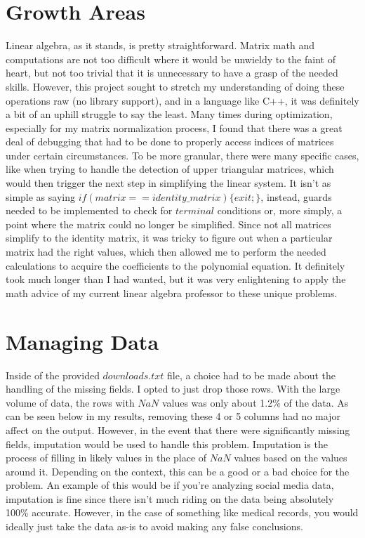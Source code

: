 \documentclass[11pt]{apa6}
\begin{document}
\section{Growth Areas}
Linear algebra, as it stands, is pretty straightforward. Matrix math and computations are not too difficult where it would be unwieldy to the faint of heart, but not too trivial that it is unnecessary to have a grasp of the needed skills. However,
this project sought to stretch my understanding of doing these operations raw (no library support), and in a language like C++, it was definitely a bit of an uphill struggle to say the least. Many times during optimization, especially for my matrix
normalization process, I found that there was a great deal of debugging that had to be done to properly access indices of matrices under certain circumstances. To be more granular, there were many specific cases, like when trying to handle the
detection of upper triangular matrices, which would then trigger the next step in simplifying the linear system. It isn't as simple as saying $if (matrix == identity\_matrix) \{ exit; \}$, instead, guards needed to be implemented to check for $terminal$
conditions or, more simply, a point where the matrix could no longer be simplified. Since not all matrices simplify to the identity matrix, it was tricky to figure out when a particular matrix had the right values, which then allowed me to perform
the needed calculations to acquire the coefficients to the polynomial equation. It definitely took much longer than I had wanted, but it was very enlightening to apply the math advice of my current linear algebra professor to these unique problems.

\section{Managing Data}
Inside of the provided $downloads.txt$ file, a choice had to be made about the handling of the missing fields. I opted to just drop those rows. With the large volume of data, the rows with $NaN$ values was only about 1.2\% of the data. As can be seen below in my results, removing these 4 or 5 columns had no major affect on the output. However, in the event that there were significantly missing fields, imputation would be used to handle this problem. Imputation is the process of filling in likely values in the place of $NaN$ values based on the values around it. Depending on the context, this can be a good or a bad choice for the problem. An example of this would be if you're analyzing social media data, imputation is fine since there isn't much riding on the data being absolutely 100\% accurate. However, in the case of something like medical records, you would ideally just take the data as-is to avoid making any false conclusions.
\end{document}

